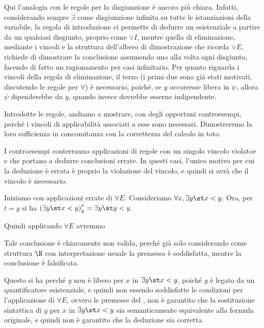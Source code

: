 Qui l'analogia con le regole per la disgiunzione è ancora più chiara. Infatti, considerando sempre \(\exists\) come disgiunzione infinita su tutte le istanziazioni della variabile, la regola di introduzione ci permette di dedurre un esistenziale a partire da un qualsiasi disgiunto, proprio come \(\lor I\), mentre quella di eliminazione, mediante i vincoli e la struttura dell'albero di dimostrazione che ricorda \(\lor E\), richiede di dimostrare la conclusione assumendo uno alla volta ogni disgiunto, facendo di fatto un ragionamento per casi infinitario.
Per quanto riguarda i vincoli della regola di eliminazione, il terzo (i primi due sono già stati motivati, discutendo le regole per \(\forall\)) è necessario, poiché, se \(y\) occorresse libera in \(\psi\), allora \(\psi\) dipenderebbe da \(y\), quando invece dovrebbe esserne indipendente.

\vspace{1cm}\noindent
Introdotte le regole, andiamo a mostrare, con degli opportuni controesempi, perché i vincoli di applicabilità associati a esse sono necessari. Dimostreremo la loro sufficienza in concomitanza con la correttezza del calcolo in toto.

I controesempi conterranno applicazioni di regole con un singolo vincolo violatoe e che portano a dedurre conclusioni errate. In questi casi, l'unico motivo per cui la deduzione è errata è proprio la violazione del vincolo, e quindi si avrà che il vincolo è necessario.

Iniziamo con applicazioni errate di \(\forall E\). Consideriamo \(\forall x, \exists y\st x < y\). Ora, per \(t=y\) si ha \(\subs{\exists y\st x < y}{x}{y} = \exists y\st y < y\).

Quindi applicando \(\forall E\) avremmo

\begin{prooftree}
\end{prooftree}

Tale conclusione è chiaramente non valida, perché già solo considerando come struttura \(\N\) con interpretazione usuale la premessa è soddisfatta, mentre la conclusione è falsificata.

Questo si ha perché \(y\) non è libero per \(x\) in \(\exists y\st x < y\), poiché \(y\) è legato da un quantificatore esistenziale, e quindi non essendo soddisfatte le condizioni per l'applicazione di \(\forall E\), ovvero le premesse del , non è garantito che la sostituzione sintattica di \(y\) per \(x\) in \(\exists y\st x < y\) sia semanticamente equivalente alla formula originale, e quindi non è garantito che la deduzione sia corretta.

